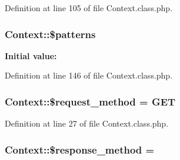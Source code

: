 Definition at line 105 of file Context.\+class.\+php.

\subsubsection[{\texorpdfstring{\$patterns}{$patterns}}]{\setlength{\rightskip}{0pt plus 5cm}Context\+::\$patterns}\hypertarget{classContext_a257fa15929338411949a173ff34ab35d}{}\label{classContext_a257fa15929338411949a173ff34ab35d}
{\bfseries Initial value\+:}


Definition at line 146 of file Context.\+class.\+php.

\subsubsection[{\texorpdfstring{\$request\+\_\+method}{$request_method}}]{\setlength{\rightskip}{0pt plus 5cm}Context\+::\$request\+\_\+method = \textquotesingle{}G\+ET\textquotesingle{}}\hypertarget{classContext_a1e80f487f65708456eb17be0024aee50}{}\label{classContext_a1e80f487f65708456eb17be0024aee50}


Definition at line 27 of file Context.\+class.\+php.

\subsubsection[{\texorpdfstring{\$response\+\_\+method}{$response_method}}]{\setlength{\rightskip}{0pt plus 5cm}Context\+::\$response\+\_\+method = \textquotesingle{}\textquotesingle{}}\hypertarget{classContext_a383836fb81ee24d673c7145e4d2eb030}{}\label{classContext_a383836fb81ee24d673c7145e4d2eb030}


